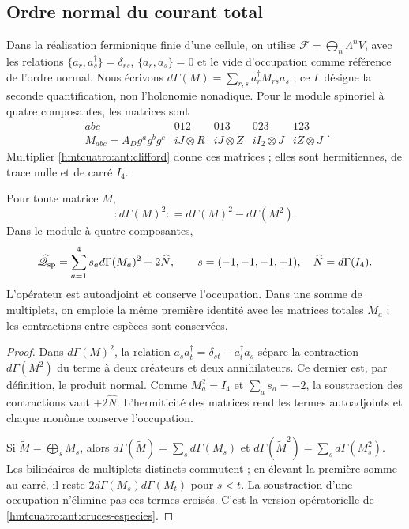 \subsection{Ordre normal du courant total}
\label{hmtcuatro:ant:car}

Dans la réalisation fermionique finie d’une cellule, on utilise \(\mathcal F=\bigoplus_n\Lambda^n V\), avec les relations \(\{a_r,a_s^\dagger\}=\delta_{rs}\), \(\{a_r,a_s\}=0\) et le vide d’occupation comme référence de l’ordre normal. Nous écrivons \(d\Gamma(M)=\sum_{r,s}a_r^\dagger M_{rs}a_s\) ; ce \(\Gamma\) désigne la seconde quantification, non l’holonomie nonadique. Pour le module spinoriel à quatre composantes, les matrices sont
\[
 \begin{array}{c|cccc}
 abc&012&013&023&123\\ \hline
 M_{abc}=A_Dg^ag^bg^c&
 iJ\otimes R&iJ\otimes Z&iI_2\otimes J&iZ\otimes J
 \end{array}.
\]
Multiplier \eqref{hmtcuatro:ant:clifford} donne ces matrices ; elles sont hermitiennes, de trace nulle et de carré \(I_4\).

\begin{proposition}
\label{hmtcuatro:ant:orden-normal} Pour toute matrice \(M\),
\[
 :d\Gamma(M)^2:
 =d\Gamma(M)^2-d\Gamma(M^2).
\]
Dans le module à quatre composantes,
\[
 \widehat{\mathscr Q}_{\rm sp}
 =\sum_{a=1}^4s_a d\Gamma(M_a)^2+2\widehat N,
 \qquad s=(-1,-1,-1,+1),\quad \widehat N=d\Gamma(I_4).
\]
L’opérateur est autoadjoint et conserve l’occupation. Dans une somme de multiplets, on emploie la même première identité avec les matrices totales \(\widetilde M_a\) ; les contractions entre espèces sont conservées.
\end{proposition}
\begin{proof}
Dans \(d\Gamma(M)^2\), la relation \(a_sa_t^\dagger=\delta_{st}-a_t^\dagger a_s\) sépare la contraction \(d\Gamma(M^2)\) du terme à deux créateurs et deux annihilateurs. Ce dernier est, par définition, le produit normal. Comme \(M_a^2=I_4\) et \(\sum_a s_a=-2\), la soustraction des contractions vaut \(+2\widehat N\). L’hermiticité des matrices rend les termes autoadjoints et chaque monôme conserve l’occupation.

Si \(\widetilde M=\bigoplus_s M_s\), alors \(d\Gamma(\widetilde M)=\sum_s d\Gamma(M_s)\) et \(d\Gamma(\widetilde M^2)=\sum_s d\Gamma(M_s^2)\). Les bilinéaires de multiplets distincts commutent ; en élevant la première somme au carré, il reste \(2d\Gamma(M_s)d\Gamma(M_t)\) pour \(s<t\). La soustraction d’une occupation n’élimine pas ces termes croisés. C’est la version opératorielle de \eqref{hmtcuatro:ant:cruces-especies}.
\end{proof}

